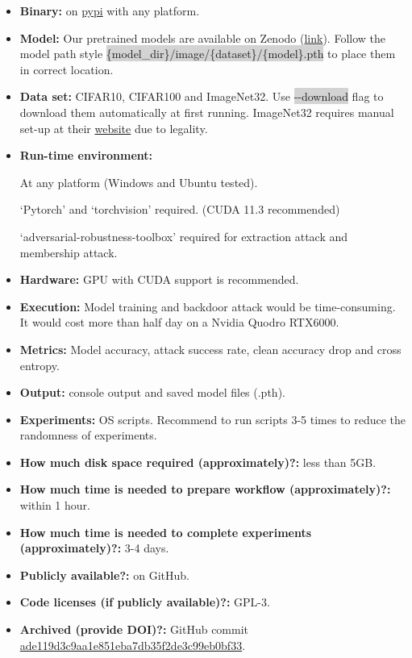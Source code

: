 \documentclass[letterpaper,twocolumn,10pt]{article}
\begin{document}
{\small
\begin{itemize}
    \item {\bf Binary: }on \href{https://pypi.org/project/autovul/}{pypi} with any platform.
    \item {\bf Model: }Our pretrained models are available on Zenodo (\href{https://zenodo.org/record/5762440}{link}). Follow the model path style \colorbox{lightgray}{\{model\_dir\}/image/\{dataset\}/\{model\}.pth} to place them in correct location.
    \item {\bf Data set: }CIFAR10, CIFAR100 and ImageNet32. Use \colorbox{lightgray}{-{}-download} flag to download them automatically at first running. ImageNet32 requires manual set-up at their \href{https://image-net.org/download-images.php}{website} due to legality.
    \item {\bf Run-time environment: }

          At any platform (Windows and Ubuntu tested).

          `Pytorch' and `torchvision' required. (CUDA 11.3 recommended)

          `adversarial-robustness-toolbox' required for extraction attack and membership attack.
    \item {\bf Hardware: }GPU with CUDA support is recommended.
    \item {\bf Execution: }Model training and backdoor attack would be time-consuming. It would cost more than half day on a Nvidia Quodro RTX6000.
    \item {\bf Metrics: }Model accuracy, attack success rate, clean accuracy drop and cross entropy.
    \item {\bf Output: }console output and saved model files (.pth).
    \item {\bf Experiments: }OS scripts. Recommend to run scripts 3-5 times to reduce the randomness of experiments.
    \item {\bf How much disk space required (approximately)?: }less than 5GB.
    \item {\bf How much time is needed to prepare workflow (approximately)?: }within 1 hour.
    \item {\bf How much time is needed to complete experiments (approximately)?: }3-4 days.
    \item {\bf Publicly available?: }on GitHub.
    \item {\bf Code licenses (if publicly available)?: }GPL-3.
    \item {\bf Archived (provide DOI)?: }GitHub commit \href{https://github.com/ain-soph/autovul/tree/ade119d3c9aa1e851eba7db35f2de3c99eb0bf33}{ade119d3c9aa1e851eba7db35f2de3c99eb0bf33}.
\end{itemize}

}
\end{document}

